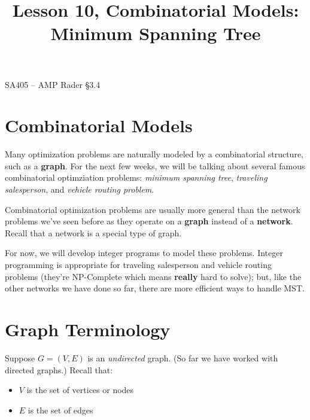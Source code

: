\documentclass[11pt]{article}
\makeatletter
\theoremstyle{definition}
\newcommand{\answerbox}[3]{%
  \fbox{%
    \begin{minipage}[#1]{#2}
      \hfill\vspace{#3}
    \end{minipage}
  }
}
\newcommand{\answerboxfull}[2]{%
  \answerbox{#1}{6.38in}{#2} 
}
\renewcommand{\maketitle}{
  \noindent SA405 -- AMP \hfill Rader \S 3.4 \\

  \begin{center}\Large{\textbf{\@title}}\end{center}
}
\makeatother
\begin{document}
  
\title{Lesson 10,  Combinatorial Models:  Minimum Spanning Tree}

\maketitle


\section{Combinatorial Models}

Many optimization problems are naturally modeled by a combinatorial structure, such as a \textbf{graph}. For the next few weeks, we will be talking about several famous combinatorial optimziation problems: \emph{minimum spanning tree}, \emph{traveling salesperson}, and \emph{vehicle routing problem}. 

Combinatorial optimization problems are usually more general than the network problems we've seen before as they operate on a \textbf{graph} instead of a \textbf{network}. Recall that a network is a special type of graph.

%
For now, we will develop integer programs to model these problems. Integer programming is appropriate for traveling salesperson and vehicle routing problems (they're NP-Complete which means \textbf{really} hard to solve); but, like the other networks we have done so far, there are more efficient ways to handle MST.
%
%
%
%


\section{Graph Terminology}


Suppose $G = (V,E)$ is an \emph{undirected} graph. (So far we have worked with directed graphs.) Recall that:
	\begin{itemize}
	\item $V$ is the set of vertices or nodes
	\item $E$ is the set of edges
	\end{itemize}
\end{document}
